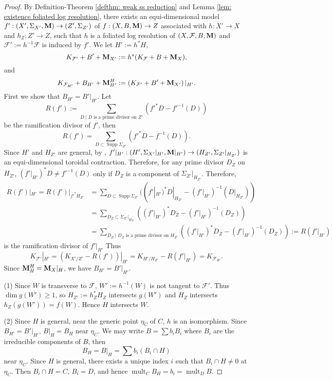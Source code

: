 \documentclass[11pt]{amsart}
\numberwithin{equation}{section}
\newcommand{\Mm}{{\bf{M}}}
\newcommand{\Supp}{\operatorname{Supp}}
\newcommand{\mult}{\operatorname{mult}}
\newcommand{\Ff}{\mathcal{F}}
\theoremstyle{definition}
\theoremstyle{definition}
\theoremstyle{definition}
\begin{document}
\begin{proof}
By Definition-Theorem \ref{defthm: weak ss reduction} and Lemma \ref{lem: existence foliated log resolution}, there exists an equi-dimensional model $f': (X',\Sigma_{X'},\Mm)\rightarrow (Z',\Sigma_{Z'})$ of $f: (X,B,\Mm)\rightarrow Z$ associated with $h: X'\rightarrow X$ and $h_Z: Z'\rightarrow Z$, such that $h$ is a foliated log resolution of $(X,\Ff,B,\Mm)$ and $\Ff':=h^{-1}\Ff$ is induced by $f'$. We let $H':=h^*H$,
$$K_{\Ff'}+B'+\Mm_{X'}:=h^*(K_{\Ff}+B+\Mm_X),$$
and
$$K_{\Ff_{H'}}+B_{H'}+\Mm^H_{H'}:=\left(K_{\Ff'}+B'+\Mm_{X'}\right)|_{H'}.$$ 
First we show that $B_{H'}=B'|_{H'}$. Let
$$R(f'):=\sum_{D\mid D\text{ is a prime divisor on }Z'}(f'^*D-f'^{-1}(D))$$
be the ramification divisor of $f'$, then
$$R(f')=\sum_{D\subset\Supp\Sigma_{Z'}}(f'^*D-f^{-1}(D)).$$
Since $H'$ and $H_{Z'}$ are general, by \cite[Proposition 3.2]{AK00}, $f'|_{H'}:(H',\Sigma_{X'}|_{H'},\Mm|_{H'})\rightarrow (H_{Z'},\Sigma_{Z'}|_{H_{Z'}})$ is an equi-dimensional toroidal contraction. Therefore, for any prime divisor $D_Z$ on $H_{Z'}$, $(f'|_{H'})^*D\not=f'^{-1}(D)$ only if $D_Z$ is a component of $\Sigma_{Z'}|_{H_{Z'}}$. Therefore,
\begin{align*}
R(f')|_{H'}=R(f')|_{f'^*H_{Z'}}&=\sum_{D\subset\Supp\Sigma_{Z'}}((f'|_{H'})^*D|_{H_{Z'}}-(f'|_{H'})^{-1}(D|_{H_{Z'}}))\\
&=\sum_{D_Z\subset\Sigma_{Z'}|_{H_{Z'}}}((f'|_{H'})^*D_Z-(f'|_{H'})^{-1}(D_Z))\\
&=\sum_{D_Z\mid D_Z\text{ is a prime divisor on }H_{Z'}}((f'|_{H'})^*D_Z-(f'|_{H'})^{-1}(D_Z)):=R(f'|_{H'})
\end{align*}
is the ramification divisor of $f'|_{H'}$ Thus
$$K_{\Ff'}|_{H'}=(K_{X'/Z'}-R(f'))|_{H'}=K_{H'/H_{Z'}}-R(f'|_{H'})=K_{\Ff_{H'}}.$$
Since  $\Mm^H_H=\Mm_X|_H$, we have $B_{H'}=B'|_{H'}$. 

(1) Since  $W$ is transverse to $\Ff$,  $W':=h^{-1}(W)$ is not tangent to $\Ff'$. Thus $\dim g(W')\geq 1$, so $H_{Z'}:=h_Z^*H_Z$ intersects $g(W')$ and $H_Z$ intersects $h_Z(g(W'))=f(W)$. Hence $H$ intersects $W$.

(2) Since $H$ is general, near the generic point $\eta_C$ of $C$, $h$ is an isomorphism. Since $B_{H'}=B'|_{H'}$, $B|_H=B_H$ near $\eta_C$. We may write $B=\sum b_iB_i$ where $B_i$ are the irreducible components of $B$, then 
$$B_H=B|_H=\sum b_i(B_i\cap H)$$ 
near $\eta_C$. Since $H$ is general, there exists a unique index $i$ such that $B_i\cap H\not=0$ at $\eta_C$. Then $B_i\cap H=C$, $B_i=D$, and hence $\mult_CB_H=b_i=\mult_DB$.


\end{proof}
\end{document}

